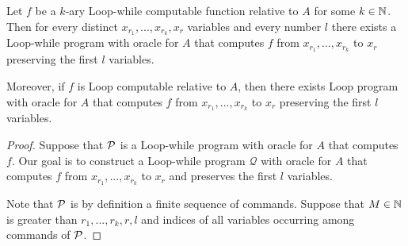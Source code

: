 \documentclass[10pt]{amsart}
\begin{document}
\begin{proposition}\label{proposition:Loop_while_computable_implies_Loop_while_computable_with_preservation_of_first_variables}
	Let $f$ be a $k$-ary Loop-while computable function relative to $A$ for some $k\in {\mathbb N}$. Then for every distinct $x_{r_1},...,x_{r_k},x_r$ variables and every number $l$ there exists a Loop-while program with oracle for $A$ that computes $f$ from $x_{r_1},...,x_{r_k}$ to $x_r$ preserving the first $l$ variables.

	Moreover, if $f$ is Loop computable relative to $A$, then there exists Loop program with oracle for $A$ that computes $f$ from $x_{r_1},...,x_{r_k}$ to $x_r$ preserving the first $l$ variables.
\end{proposition}
\begin{proof}
	Suppose that ${\mathcal P}$ is a Loop-while program with oracle for $A$ that computes $f$. Our goal is to construct a Loop-while program $\mathcal{Q}$ with oracle for $A$ that computes $f$ from $x_{r_1},...,x_{r_k}$ to $x_r$ and preserves the first $l$ variables.

	Note that ${\mathcal P}$ is by definition a finite sequence of commands. Suppose that $M \in {\mathbb N}$ is greater than $r_1,...,r_k,r,l$ and indices of all variables occurring among commands of ${\mathcal P}$.


\end{proof}
\end{document}

